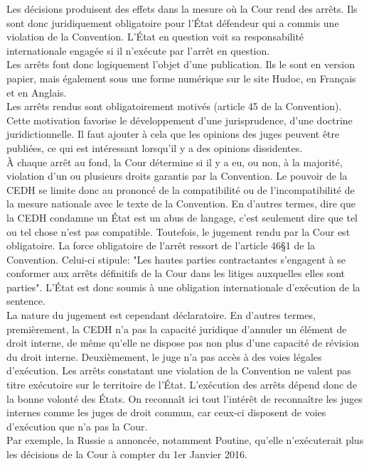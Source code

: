 \documentclass[10pt, a4paper, openany]{book}
\begin{document}
Les décisions produisent des effets dans la mesure où la Cour rend des arrêts. Ils sont donc juridiquement obligatoire pour l'État défendeur qui a commis une violation de la Convention. L'État en question voit sa responsabilité internationale engagée si il n'exécute par l'arrêt en question. \\
Les arrêts font donc logiquement l'objet d'une publication. Ils le sont en version papier, mais également sous une forme numérique sur le site Hudoc, en Français et en Anglais. \\
Les arrêts rendus sont obligatoirement motivés (article 45 de la Convention). Cette motivation favorise le développement d'une jurisprudence, d'une doctrine juridictionnelle. Il faut ajouter à cela que les opinions des juges peuvent être publiées, ce qui est intéressant lorsqu'il y a des opinions dissidentes. \\
À chaque arrêt au fond, la Cour détermine si il y a eu, ou non, à la majorité, violation d'un ou plusieurs droits garantis par la Convention. Le pouvoir de la CEDH se limite donc au prononcé de la compatibilité ou de l'incompatibilité de la mesure nationale avec le texte de la Convention. En d'autres termes, dire que la CEDH condamne un État est un abus de langage, c'est seulement dire que tel ou tel chose n'est pas compatible. Toutefois, le jugement rendu par la Cour est obligatoire. La force obligatoire de l'arrêt ressort de l'article 46§1 de la Convention. Celui-ci stipule: "Les hautes parties contractantes s'engagent à se conformer aux arrêts définitifs de la Cour dans les litiges auxquelles elles sont parties". L'État est donc soumis à une obligation internationale d'exécution de la sentence. \\
La nature du jugement est cependant déclaratoire. En d'autres termes, premièrement, la CEDH n'a pas la capacité juridique d'annuler un élément de droit interne, de même qu'elle ne dispose pas non plus d'une capacité de révision du droit interne. Deuxièmement, le juge n'a pas accès à des voies légales d'exécution. Les arrêts constatant une violation de la Convention ne valent pas titre exécutoire sur le territoire de l'État. L'exécution des arrêts dépend donc de la bonne volonté des États. On reconnaît ici tout l'intérêt de reconnaître les juges internes comme les juges de droit commun, car ceux-ci disposent de voies d'exécution que n'a pas la Cour. \\
Par exemple, la Russie a annoncée, notamment Poutine, qu'elle n'exécuterait plus les décisions de la Cour à compter du 1er Janvier 2016. 
\end{document}
